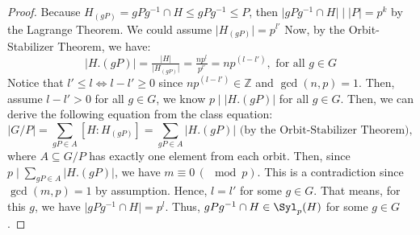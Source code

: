 \begin{answer}
\begin{proof}
        Because $H_{(gP)} = gPg^{-1} \cap H \leqslant gPg^{-1} \leqslant P$, then $\lvert gPg^{-1} \cap H \rvert \mid \lvert P \rvert = p^k$ by the Lagrange Theorem. We could assume $\lvert H_{(gP)} \rvert = p^{l'}$ Now, by the Orbit-Stabilizer Theorem, we have:
        \begin{equation}
            \lvert H.(gP) \rvert = \tfrac{\lvert H \rvert}{\lvert H_{(gP)} \rvert} = \tfrac{np^l}{p^{l'}} = np^{(l-l')}, \text{ for all $g \in G$}
        \end{equation}
        Notice that $l' \leq l \Leftrightarrow l - l' \geq 0$ since $np^{(l-l')} \in \mathbb{Z}$ and $\gcd(n,p) = 1$. Then, assume $l - l' > 0$ for all $g \in G$, we know $p \mid \lvert H.(gP) \rvert$ for all $g \in G$. Then, we can derive the following equation from the class equation:
        \begin{equation}
            \lvert G/P \rvert = \sum_{gP \in A} [H:H_{(gP)}] = \sum_{gP \in A} \lvert H.(gP)\rvert \text{ (by the Orbit-Stabilizer Theorem)},
        \end{equation}
        where $A \subseteq G/P$ has exactly one element from each orbit. Then, since $p \mid \sum_{gP \in A} \lvert H.(gP)\rvert$, we have $m \equiv 0 \,(\mod p)$. This is a contradiction since $\gcd(m,p) = 1$ by assumption. Hence, $l = l'$ for some $g \in G$. That means, for this $g$, we have $\lvert gPg^{-1}\cap H \rvert = p^l$. Thus, $gPg^{-1} \cap H \in \Syl_p(H)$ for some $g \in G$.
    \end{proof}
\end{answer}